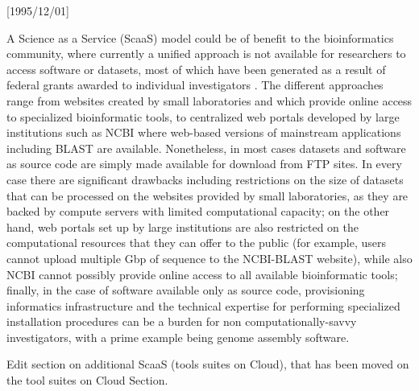\NeedsTeXFormat{LaTeX2e}[1995/12/01] \documentclass[10pt]{bmc_article}
\newenvironment{bmcformat}{\begin{raggedright}\baselineskip20pt\sloppy\setboolean{publ}{false}}{\end{raggedright}\baselineskip20pt\sloppy}
\begin{document}
\begin{bmcformat}
A Science as a Service (ScaaS) model could be of benefit to the bioinformatics community, where currently a unified approach is
not available for researchers to access software or datasets, most of which have been generated as a result of federal grants 
awarded to individual investigators \cite{Stein2010}.  The different approaches range from websites created
by small laboratories and which provide online access to specialized bioinformatic tools,  to centralized web portals 
developed by large institutions such as NCBI \cite{ncbi} where web-based versions of mainstream applications including BLAST 
\cite{altchul}  are available. Nonetheless, in most cases datasets and software as source code are simply made available for 
download from FTP sites. In every case there are significant drawbacks including restrictions on the size of datasets that can be 
processed on the websites provided by small laboratories, as they are backed by compute servers with limited computational 
capacity; on the other hand, web portals set up by large institutions are also restricted on the computational resources that 
they can offer to the public (for example, users cannot upload multiple Gbp of sequence to the NCBI-BLAST website), while also
NCBI cannot possibly provide online access to all available bioinformatic tools; finally, in the case of software available only as 
source code, provisioning informatics infrastructure and the technical expertise for performing specialized installation 
procedures can be a burden for non computationally-savvy investigators, with a prime example being genome assembly software.  \pb


Edit section on additional ScaaS (tools suites on Cloud), that has been moved on the tool suites on Cloud Section.


\end{bmcformat}
\end{document}
